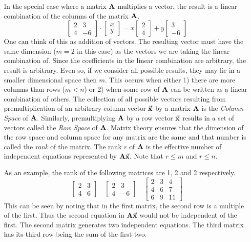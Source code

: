 In the special case where a matrix ${\textbf{A}}$ multiplies a vector,
the result is a linear combination of the columns of the matrix ${\textbf{A}}$.
\[
   \begin{bmatrix}
      2 & 3 \\ 4 & -6
   \end{bmatrix}
   \cdot
   \begin{bmatrix}
      x \\ y
   \end{bmatrix}
    =
   x
   \begin{bmatrix}
      2 \\ 4
   \end{bmatrix}
   +y
   \begin{bmatrix}
      3 \\ -6
   \end{bmatrix}
\]
One can think of this as addition of vectors.  The resulting vector must have the
same dimension ($m=2$ in this case) as the vectors we are taking the linear combination of.  
Since the coefficients in the linear combination are arbitrary, the result is arbitrary.
Even so, if we consider all possible results, they may lie in a smaller dimensional space 
then $m$.  
This occurs when either 1) there are more columns than  rows ($m<n$) or 
2) when some row of ${\textbf{A}}$ can be written as a linear combination of others.
The collection of all possible vectors resulting from premultiplication
of an arbitrary column vector $\vec{\textbf{x}}$ by a matrix ${\textbf{A}}$ is the \emph{Column Space} of ${\textbf{A}}$.
Similarly, premultiplying ${\textbf{A}}$ by a row vector $\vec{\textbf{x}}$ results in a set of vectors
called the \emph{Row Space} of ${\textbf{A}}$.  Matrix theory ensures that the dimension
of the row space and column space for any matrix are the same and that number is called
the \emph{ rank} of the matrix.  The rank $r$ of ${\textbf{A}}$ is the effective number of 
independent equations represented by ${\textbf{A}}\vec{\textbf{x}}$.  Note that $r\leq m$ and $r\leq n$.

As an example, the rank of the following matrices are 1, 2 and 2 respectively.
\[
   \begin{bmatrix}
      2 & 3 \\ 4 & 6
   \end{bmatrix}
   \quad
   \begin{bmatrix}
      2 & 3 \\ 4 & -6
   \end{bmatrix}
   \quad
   \begin{bmatrix}
      2 & 3 & 4 \\ 4 & 6 & 7 \\ 6 & 9 & 11
   \end{bmatrix}
\]
This can be seen by noting that in the first matrix, the second row is a multiple of
the first.  Thus the second equation in ${\textbf{A}} \vec{\textbf{x}}$ would not be independent of the first.
The second matrix generates two independent equations. 
The third matrix has its third row being the sum of the first two.

